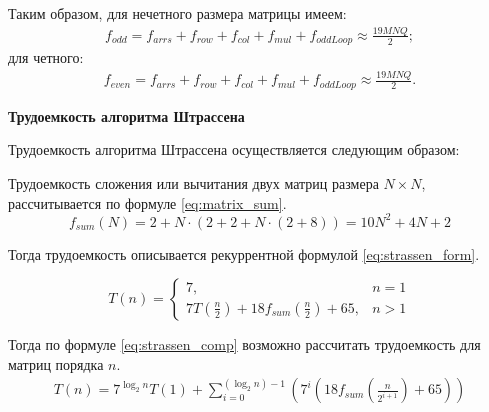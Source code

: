 Таким образом, для нечетного размера матрицы имеем:
\begin{multline}
	f_{odd} = f_{arrs} + f_{row} + f_{col} + f_{mul} + f_{oddLoop}  \approx \frac{19MNQ}{2};
\end{multline}
для четного:
\begin{multline}
	f_{even} = f_{arrs} + f_{row} + f_{col} + f_{mul} + f_{oddLoop}  \approx \frac{19MNQ}{2}.
\end{multline}


\textbf{Трудоемкость алгоритма Штрассена}

Трудоемкость алгоритма Штрассена осуществляется следующим образом:

Трудоемкость сложения или вычитания двух матриц размера $N \times N$, рассчитывается по формуле \eqref{eq:matrix_sum}.
\begin{equation}
	\label{eq:matrix_sum}
	f_{sum}(N) = 2 + N \cdot (2 + 2 + N \cdot (2 + 8)) = 10N^2 + 4N + 2
\end{equation}

Тогда трудоемкость описывается рекуррентной формулой \eqref{eq:strassen_form}.

\begin{equation}
	\label{eq:strassen_form}
	T(n) = 
	\begin{cases}
		7, & n = 1\\
		7T(\frac{n}{2}) + 18f_{sum}(\frac{n}{2}) + 65, & n > 1
	\end{cases}
\end{equation}

Тогда по формуле \eqref{eq:strassen_comp} возможно рассчитать трудоемкость для матриц порядка $n$.
\begin{equation}
	\label{eq:strassen_comp}
	\begin{gathered}
		T(n) = 7^{\log_{2}{n}} T(1) + \sum_{i=0}^{(\log_{2}{n}) - 1} (7^i (18f_{sum}(\frac{n}{2 ^ {i + 1}}) + 65))
	\end{gathered}
\end{equation}
